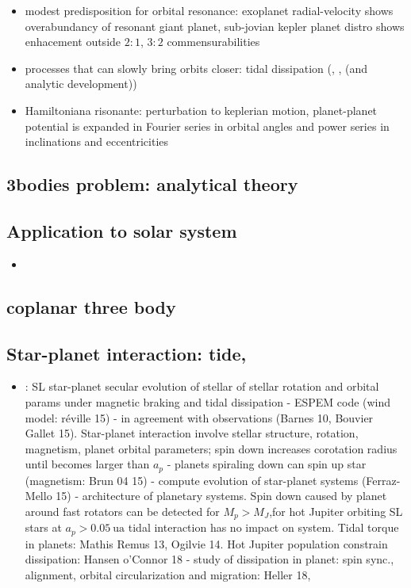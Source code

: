\documentclass[main.tex]{subfiles}
\begin{document}
\begin{itemize}
\item modest predisposition for orbital resonance: exoplanet radial-velocity shows overabundancy of resonant giant planet, sub-jovian kepler planet distro shows enhacement outside $2:1$, $3:2$ commensurabilities
\item processes that can slowly bring orbits closer: tidal dissipation (\cite{goldreich1966q}, \cite{yoder1981tides}, \cite{peale1976orbital} (and analytic development))    
\item Hamiltoniana risonante: perturbation to keplerian motion, planet-planet potential is expanded in Fourier series in orbital angles and power series in inclinations and eccentricities
\end{itemize}

\subsection{3bodies problem: analytical theory}

\subsection{Application to solar system}
\begin{itemize}
    \item 
\end{itemize}
\subsection{coplanar three body}

\subsection{Star-planet interaction: tide, }

\begin{itemize}
    \item \cite{benbakoura2019evolution}: SL star-planet secular evolution of stellar of stellar rotation and orbital params under magnetic braking and tidal dissipation - ESPEM code (wind model: r\'eville 15) - in agreement with observations (Barnes 10, Bouvier Gallet 15). Star-planet interaction involve stellar structure, rotation, magnetism, planet orbital parameters; spin down increases corotation radius until becomes larger than $a_p$ - planets spiraling down can spin up star (magnetism: Brun 04 15) - compute evolution of star-planet systems (Ferraz-Mello 15) - architecture of planetary systems. Spin down caused by planet around fast rotators can be detected for $M_p>M_J$,for hot Jupiter orbiting SL stars at $a_p>\SI{0.05}{\astronomicalunit}$ tidal interaction has no impact on system. Tidal torque in planets: Mathis Remus 13, Ogilvie 14. Hot Jupiter population constrain dissipation: Hansen o'Connor 18 - study of dissipation in planet: spin sync., alignment, orbital circularization and migration: Heller 18, 
\end{itemize}
\end{document}
